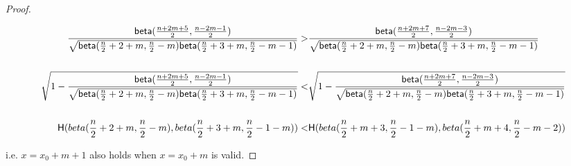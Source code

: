 \begin{proof}
\begin{small}
\begin{equation*}
\begin{split}
\frac{\mathsf{beta}(\frac{n + 2m + 5}{2}, \frac{n - 2m - 1}{2})}
{\sqrt{
\mathsf{beta}(\frac{n}{2} + 2 + m, \frac{n}{2} - m)
\mathsf{beta}(\frac{n}{2} + 3 + m, \frac{n}{2} - m - 1)
}
}
> & \frac{\mathsf{beta}(\frac{n + 2m + 7}{2}, \frac{n - 2m - 3}{2})}
{\sqrt{
\mathsf{beta}(\frac{n}{2} + 2 + m, \frac{n}{2} - m)
\mathsf{beta}(\frac{n}{2} + 3 + m, \frac{n}{2} - m - 1)
}
}\\
\\
\sqrt{1 - \frac{\mathsf{beta}(\frac{n + 2m + 5}{2}, \frac{n - 2m - 1}{2})}
{\sqrt{
\mathsf{beta}(\frac{n}{2} + 2 + m, \frac{n}{2} - m)
\mathsf{beta}(\frac{n}{2} + 3 + m, \frac{n}{2} - m - 1)
}
}}
< & \sqrt{1 - \frac{\mathsf{beta}(\frac{n + 2m + 7}{2}, \frac{n - 2m - 3}{2})}
{\sqrt{
\mathsf{beta}(\frac{n}{2} + 2 + m, \frac{n}{2} - m)
\mathsf{beta}(\frac{n}{2} + 3 + m, \frac{n}{2} - m - 1)
}
}}\\
\\
\mathsf{H}(beta(\frac{n}{2} + 2 + m, \frac{n}{2} - m), beta(\frac{n}{2} + 3 + m, \frac{n}{2} - 1 - m))
< & \mathsf{H}(beta(\frac{n}{2} + m + 3, \frac{n}{2} - 1 - m), beta(\frac{n}{2} + m + 4, \frac{n}{2} - m - 2))\\
\end{split}
\end{equation*}
\end{small}

i.e. $ x = x_0 + m + 1$ also holds when $x = x_0 + m$ is valid.
\end{proof}


